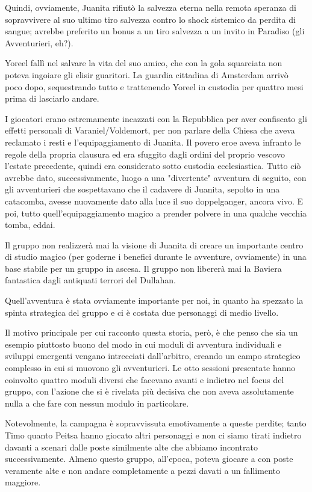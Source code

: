 Quindi, ovviamente, Juanita rifiutò la salvezza eterna nella remota speranza di sopravvivere al suo ultimo tiro salvezza contro lo shock sistemico da perdita di sangue; avrebbe preferito un bonus a un tiro salvezza a un invito in Paradiso (gli Avventurieri, eh?).

Yoreel fallì nel salvare la vita del suo amico, che con la gola squarciata non poteva ingoiare gli elisir guaritori. La guardia cittadina di Amsterdam arrivò poco dopo, sequestrando tutto e trattenendo Yoreel in custodia per quattro mesi prima di lasciarlo andare.

I giocatori erano estremamente incazzati con la Repubblica per aver confiscato gli effetti personali di Varaniel/Voldemort, per non parlare della Chiesa che aveva reclamato i resti e l'equipaggiamento di Juanita. Il povero eroe aveva infranto le regole della propria clausura ed era sfuggito dagli ordini del proprio vescovo l'estate precedente, quindi era considerato sotto custodia ecclesiastica. Tutto ciò avrebbe dato, successivamente, luogo a una "divertente" avventura di seguito, con gli avventurieri che sospettavano che il cadavere di Juanita, sepolto in una catacomba, avesse nuovamente dato alla luce il suo doppelganger, ancora vivo. E poi, tutto quell'equipaggiamento magico a prender polvere in una qualche vecchia tomba, eddai.

Il gruppo non realizzerà mai la visione di Juanita di creare un importante centro di studio magico (per goderne i benefici durante le avventure, ovviamente) in una base stabile per un gruppo in ascesa. Il gruppo non libererà mai la Baviera fantastica dagli antiquati terrori del Dullahan.

Quell'avventura è stata ovviamente importante per noi, in quanto ha spezzato la spinta strategica del gruppo e ci è costata due personaggi di medio livello.

Il motivo principale per cui racconto questa storia, però, è che penso che sia un esempio piuttosto buono del modo in cui moduli di avventura individuali e sviluppi emergenti vengano intrecciati dall'arbitro, creando un campo strategico complesso in cui si muovono gli avventurieri. Le otto sessioni presentate hanno coinvolto quattro moduli diversi che facevano avanti e indietro nel focus del gruppo, con l'azione che si è rivelata più decisiva che non aveva assolutamente nulla a che fare con nessun modulo in particolare.

Notevolmente, la campagna è sopravvissuta emotivamente a queste perdite; tanto Timo quanto Peitsa hanno giocato altri personaggi e non ci siamo tirati indietro davanti a scenari dalle poste similmente alte che abbiamo incontrato successivamente. Almeno questo gruppo, all'epoca, poteva giocare a \dnd{} con poste veramente alte e non andare completamente a pezzi davati a un fallimento maggiore.